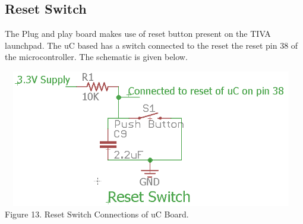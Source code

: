 \documentclass[a4paper,10pt,oneside]{article}
\begin{document}
{	\subsection{\textbf{Reset Switch}}
	{The Plug and play board makes use of reset button present on the TIVA launchpad. The uC based has a switch connected to the reset the reset pin 38 of the microcontroller. The schematic is given below.}\\
	\begin{center}
		\includegraphics[width=13cm, height=6cm]{Images/Reset_Switch}\\
		Figure 13. Reset Switch Connections of uC Board.\\
	\end{center}
}
\end{document}
